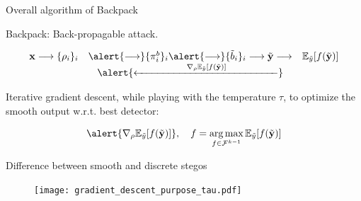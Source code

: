 \documentclass[10pt,aspectratio=169]{beamer}
\DeclareMathOperator*{\argmax}{arg\,max}
\begin{document}
\begin{frame}{Overall algorithm of Backpack}


    \alert{Backpack}: \alert{Back-p}ropagable att\alert{ack}.

    \begin{equation*}
        \begin{array}{ccc}
            \mathbf{x} \longrightarrow \{\rho_i\}_i & \alert{\longrightarrow}  \{\pi_i^b\}_i    \alert{\longrightarrow} \{\tilde{b}_i\}_i \longrightarrow  \tilde{\mathbf{y}}  \longrightarrow  & \mathbb{E}_{\tilde{y}}[f(\tilde{\mathbf{y}})] \\
            & \alert{\xleftarrow{\hspace{5em} \nabla_\rho \mathbb{E}_{\tilde{y}} [f(\tilde{\mathbf{y}})]\hspace{5em}}} 
        \end{array}
    \end{equation*}

    \pause
    Iterative gradient descent, while playing with the temperature $\tau$, to optimize the smooth output w.r.t. best detector:

    \begin{equation}
        \alert{\nabla_\rho \mathbb{E}_{\tilde{y}} [f(\tilde{\mathbf{y}})]}, \quad  f = \argmax_{f \in \mathcal{F}^{k-1}} \mathbb{E}_{\tilde{y}} [f(\tilde{\mathbf{y}})]
    \end{equation}

\end{frame}

\begin{frame}{Difference between smooth and discrete stegos}
    \begin{figure}[h]
        \texttt{[image: gradient\_descent\_purpose\_tau.pdf]}
    \end{figure}
\end{frame}
\end{document}
